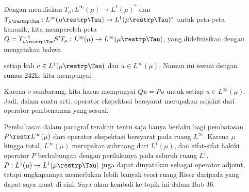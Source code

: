{
     
\noindent Dengan menuliskan
$T_{\mu}:L^{\infty}(\mu)\to L^1(\mu)^*$ dan
$T_{\mu\restrp\Tau}:L^{\infty}(\mu\restrp\Tau)\to
L^1(\mu\restrp\Tau)^*$ untuk peta-peta kanonik, kita memperoleh peta
$Q=T_{\mu\restrp\Tau}^{-1}S'T_{\mu}:
L^{\infty}(\mu)\to L^{\infty}(\mu\restrp\Tau)$, yang didefinisikan
dengan mengatakan bahwa
     
     
\noindent setiap kali $v\in L^1(\mu\restrp\Tau)$ dan
$u\in L^{\infty}(\mu)$. Namun ini sesuai dengan rumus 242L: kita
mempunyai
     
     
\noindent Karena $v$ sembarang, kita harus mempunyai $Qu=Pu$ untuk
setiap $u\in L^{\infty}(\mu)$. Jadi, dalam suatu arti, operator
ekspektasi bersyarat merupakan adjoint dari operator pembenaman yang
sesuai.
     
Pembahasan dalam paragraf terakhir tentu saja hanya berlaku bagi
pembatasan $P\restr L^{\infty}(\mu)$ dari operator ekspektasi bersyarat
pada ruang $L^{\infty}$. Karena $\mu$ hingga total,
$L^{\infty}(\mu)$ merupakan subruang dari $L^1(\mu)$, dan sifat-sifat
hakiki operator $P$ berhubungan dengan perilakunya pada seluruh ruang
$L^1$. $P:L^1(\mu)\to L^1(\mu\restrp\Tau)$ juga dapat dinyatakan sebagai
operator adjoint, tetapi ungkapannya memerlukan lebih banyak teori ruang
Riesz daripada yang dapat saya muat di sini. Saya akan kembali ke topik
ini dalam Bab 36.
}%
     
\discrpage
 
